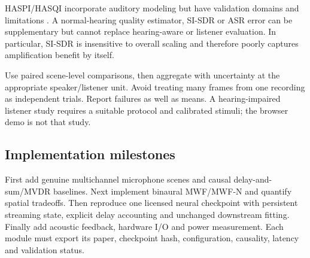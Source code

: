\documentclass[11pt,a4paper]{article}
\begin{document}
HASPI/HASQI incorporate auditory modeling but have validation domains and limitations \cite{haspi}. A normal-hearing quality estimator, SI-SDR or ASR error can be supplementary but cannot replace hearing-aware or listener evaluation. In particular, SI-SDR is insensitive to overall scaling and therefore poorly captures amplification benefit by itself.

Use paired scene-level comparisons, then aggregate with uncertainty at the appropriate speaker/listener unit. Avoid treating many frames from one recording as independent trials. Report failures as well as means. A hearing-impaired listener study requires a suitable protocol and calibrated stimuli; the browser demo is not that study.

\subsection{Implementation milestones}
First add genuine multichannel microphone scenes and causal delay-and-sum/MVDR baselines. Next implement binaural MWF/MWF-N and quantify spatial tradeoffs. Then reproduce one licensed neural checkpoint with persistent streaming state, explicit delay accounting and unchanged downstream fitting. Finally add acoustic feedback, hardware I/O and power measurement. Each module must export its paper, checkpoint hash, configuration, causality, latency and validation status.
\end{document}
